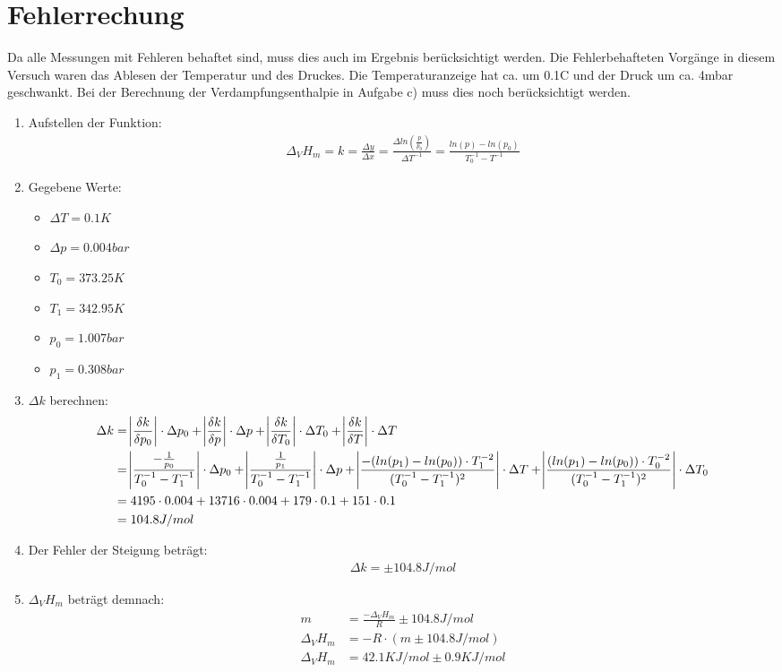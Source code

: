 \section{Fehlerrechung}
Da alle Messungen mit Fehleren behaftet sind, muss dies auch im Ergebnis
berücksichtigt werden. Die Fehlerbehafteten Vorgänge in diesem Versuch waren
das Ablesen der Temperatur und des Druckes. Die Temperaturanzeige hat ca.
um 0.1C und der Druck um ca. 4mbar geschwankt. Bei der Berechnung der 
Verdampfungsenthalpie in Aufgabe c) muss dies noch berücksichtigt werden.

\begin{enumerate}
    \item Aufstellen der Funktion:
    \begin{align*}
        \Delta_V H_m = k = \frac{\Delta y}{\Delta x} = \frac{\Delta 
        ln(\frac{p}{p_0})}{\Delta T^{-1}} 
        = \frac{ln(p) - ln(p_0)}{T_0^{-1} - T^{-1}}
    \end{align*}
    \item Gegebene Werte: 
    \begin{itemize}
        \item $\Delta T = 0.1K$
        \item $\Delta p = 0.004bar$
        \item $T_0 = 373.25K$
        \item $T_1 = 342.95K$
        \item $p_0 = 1.007bar$
        \item $p_1 = 0.308bar$
    \end{itemize}
    \item $\Delta k$ berechnen:
    \begin{align*}
        \Delta k &= \abs{\frac{\delta k}{\delta p_0}} \cdot \Delta p_0
        + \abs{\frac{\delta k}{\delta p}} \cdot \Delta p 
        + \abs{\frac{\delta k}{\delta T_0}} \cdot \Delta T_0
        + \abs{\frac{\delta k}{\delta T}} \cdot \Delta T \\
        &= \abs{\frac{-\frac{1}{p_0}}{T_0^{-1} - T_1^{-1}}} \cdot \Delta p_0
        + \abs{\frac{\frac{1}{p_1}}{T_0^{-1} - T_1^{-1}}} \cdot \Delta p
        + \abs{\frac{-(ln(p_1) - ln(p_0)) \cdot T_1^{-2}}{(T_0^{-1} - T_1^{-1})^2}} \cdot \Delta T
        + \abs{\frac{(ln(p_1)-ln(p_0)) \cdot T_0^{-2}}{(T_0^{-1} - T_1^{-1})^2}} \cdot \Delta T_0 \\
        &= 4195 \cdot 0.004 + 13716 \cdot 0.004 + 179 \cdot 0.1 + 151 \cdot 0.1 \\
        &= 104.8 J/mol
    \end{align*}
     \item Der Fehler der Steigung beträgt: 
     \begin{align*}
         \Delta k = \pm 104.8 J/mol
     \end{align*}
     \item $\Delta_V H_m$ beträgt demnach:
     \begin{align*}
        m &= \frac{-\Delta_V H_m}{R} \pm 104.8 J/mol \\
        \Delta_V H_m &= - R \cdot  (m \pm 104.8 J/mol) \\
        \Delta_V H_m &= 42.1 KJ/mol \pm 0.9 KJ/mol
     \end{align*}  
\end{enumerate} 
